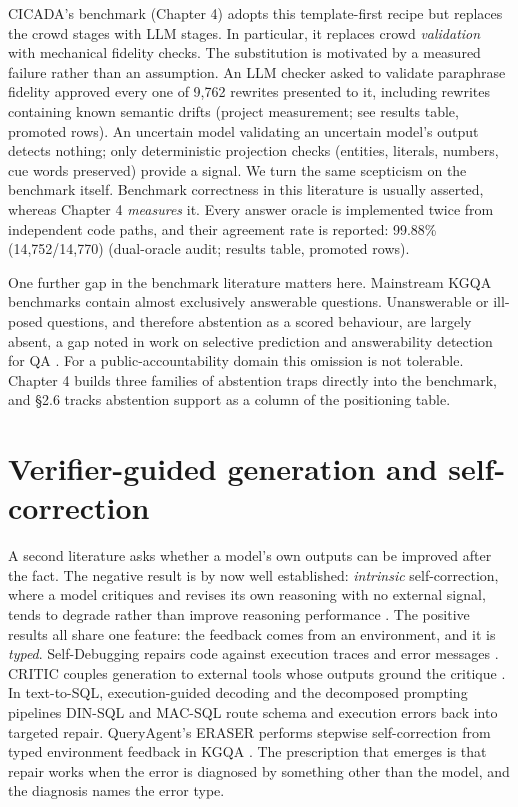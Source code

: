 CICADA's benchmark (Chapter 4) adopts this template-first recipe but replaces the crowd stages with LLM stages. In particular, it replaces crowd \emph{validation} with mechanical fidelity checks. The substitution is motivated by a measured failure rather than an assumption. An LLM checker asked to validate paraphrase fidelity approved every one of 9,762 rewrites presented to it, including rewrites containing known semantic drifts (project measurement; see results table, promoted rows). An uncertain model validating an uncertain model's output detects nothing; only deterministic projection checks (entities, literals, numbers, cue words preserved) provide a signal. We turn the same scepticism on the benchmark itself. Benchmark correctness in this literature is usually asserted, whereas Chapter 4 \emph{measures} it. Every answer oracle is implemented twice from independent code paths, and their agreement rate is reported: 99.88\% (14,752/14,770) (dual-oracle audit; results table, promoted rows).

One further gap in the benchmark literature matters here. Mainstream KGQA benchmarks contain almost exclusively answerable questions. Unanswerable or ill-posed questions, and therefore abstention as a scored behaviour, are largely absent, a gap noted in work on selective prediction and answerability detection for QA \citep{rajpurkar2018squad2,kamath2020selective}. For a public-accountability domain this omission is not tolerable. Chapter 4 builds three families of abstention traps directly into the benchmark, and §2.6 tracks abstention support as a column of the positioning table.

\section{Verifier-guided generation and self-correction}\label{sec:verifier-guided-generation-and-self-corr}

A second literature asks whether a model's own outputs can be improved after the fact. The negative result is by now well established: \emph{intrinsic} self-correction, where a model critiques and revises its own reasoning with no external signal, tends to degrade rather than improve reasoning performance \citep{huang2024intrinsic}. The positive results all share one feature: the feedback comes from an environment, and it is \emph{typed}. Self-Debugging repairs code against execution traces and error messages \citep{chen2023selfdebug}. CRITIC couples generation to external tools whose outputs ground the critique \citep{gou2024critic}. In text-to-SQL, execution-guided decoding \citep{wang2018execguided} and the decomposed prompting pipelines DIN-SQL \citep{pourreza2023dinsql} and MAC-SQL \citep{wang2024macsql} route schema and execution errors back into targeted repair. QueryAgent's ERASER performs stepwise self-correction from typed environment feedback in KGQA \citep{huang2024queryagent}. The prescription that emerges is that repair works when the error is diagnosed by something other than the model, and the diagnosis names the error type.

